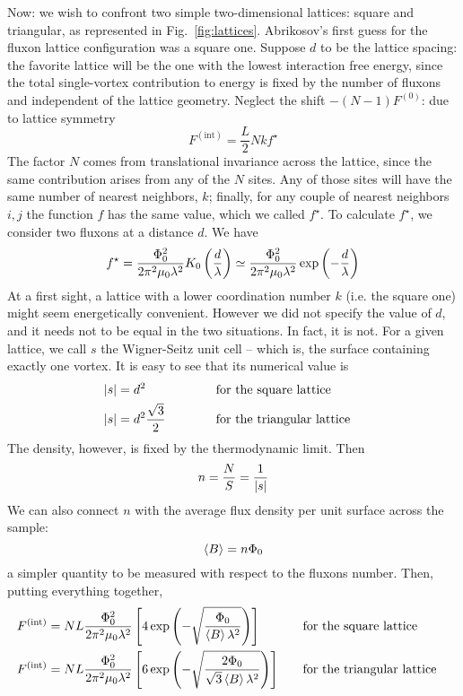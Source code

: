 Now: we wish to confront two simple two-dimensional lattices: square and triangular, as represented in Fig.~\ref{fig:lattices}. Abrikosov's first guess for the fluxon lattice configuration was a square one. Suppose $d$ to be the lattice spacing: the favorite lattice will be the one with the lowest interaction free energy, since the total single-vortex contribution to energy is fixed by the number of fluxons and independent of the lattice geometry. Neglect the shift $-(N-1) F^{(0)}$: due to lattice symmetry
\[
	F^{(\mathrm{int})} = \frac{L}{2} Nk f^\star
\]
The factor $N$ comes from translational invariance across the lattice, since the same contribution arises from any of the $N$ sites. Any of those sites will have the same number of nearest neighbors, $k$; finally, for any couple of nearest neighbors $i,j$ the function $f$ has the same value, which we called $f^\star$.
To calculate $f^\star$, we consider two fluxons at a distance $d$. We have
\[
	f^\star = \frac{\Phi_0^2}{2\pi^2\mu_0 \lambda^2} K_0 \left({\frac{d}{\lambda}}\right) \simeq \frac{\Phi_0^2}{2\pi^2\mu_0 \lambda^2} \exp \left({-\frac{d}{\lambda}}\right)
\]
At a first sight, a lattice with a lower coordination number $k$ (i.e. the square one) might seem energetically convenient. However we did not specify the value of $d$, and it needs not to be equal in the two situations. In fact, it is not. For a given lattice, we call $s$ the Wigner-Seitz unit cell -- which is, the surface containing exactly one vortex. It is easy to see that its numerical value is
\[
\begin{aligned}
	\abs{s} &= d^2 &&\qquad\qq{for the square lattice}\\
	\abs{s} &= d^2 \frac{\sqrt{3}}{2} &&\qquad\qq{for the triangular lattice}
\end{aligned}
\]
The density, however, is fixed by the thermodynamic limit. Then
\[
	n = \frac{N}{S} = \frac{1}{\abs{s}}
\]
We can also connect $n$ with the average flux density per unit surface across the sample:
\[
	\ev{B} = n \Phi_0
\]
a simpler quantity to be measured with respect to the fluxons number. Then, putting everything together,
\[
\begin{aligned}
	F^{(\mathrm{int})} &= NL \frac{\Phi_0^2}{2\pi^2\mu_0 \lambda^2} \lrS{4\exp \lrR{-\sqrt{\frac{\Phi_0}{\ev{B}\lambda^2}}}} &&\qq{for the square lattice}\\
	F^{(\mathrm{int})} &= NL \frac{\Phi_0^2}{2\pi^2\mu_0 \lambda^2} \lrS{6\exp \lrR{-\sqrt{\frac{2\Phi_0}{\sqrt{3}\ev{B}\lambda^2}}}} &&\qq{for the triangular lattice}
\end{aligned}
\]

